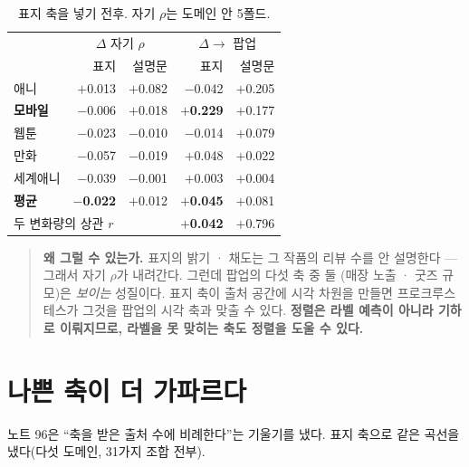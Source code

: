 \documentclass[10pt]{article}
\begin{document}
\begin{table}[t]
\centering\tsize
\caption{표지 축을 넣기 전후. 자기 $\rho$는 도메인 안 5폴드.}
\begin{tabular}{lrrrr}
\toprule
& \multicolumn{2}{c}{$\Delta$ 자기 $\rho$} & \multicolumn{2}{c}{$\Delta \to$ 팝업} \\
& 표지 & 설명문 & 표지 & 설명문 \\
\midrule
애니 & $+$0.013 & $+$0.082 & $-$0.042 & $+$0.205 \\
\textbf{모바일} & $-$0.006 & $+$0.018 & \textbf{$+$0.229} & $+$0.177 \\
웹툰 & $-$0.023 & $-$0.010 & $-$0.014 & $+$0.079 \\
만화 & $-$0.057 & $-$0.019 & $+$0.048 & $+$0.022 \\
세계애니 & $-$0.039 & $-$0.001 & $+$0.003 & $+$0.004 \\
\midrule
\textbf{평균} & \textbf{$-$0.022} & $+$0.012 & \textbf{$+$0.045} & $+$0.081 \\
\midrule
\multicolumn{3}{l}{두 변화량의 상관 $r$} & \textbf{$+$0.042} & $+$0.796 \\
\bottomrule
\end{tabular}
\end{table}


\begin{quote}\fontsize{9.5}{11.5}\selectfont
\textbf{왜 그럴 수 있는가.} 표지의 밝기 · 채도는 그 작품의 리뷰 수를 안
설명한다 --- 그래서 자기 $\rho$가 내려간다. 그런데 팝업의 다섯 축 중 둘
(매장 노출 · 굿즈 규모)은 \emph{보이는} 성질이다. 표지 축이 출처 공간에
시각 차원을 만들면 프로크루스테스가 그것을 팝업의 시각 축과 맞출 수 있다.
\textbf{정렬은 라벨 예측이 아니라 기하로 이뤄지므로, 라벨을 못 맞히는 축도
정렬을 도울 수 있다.}
\end{quote}

\section{나쁜 축이 더 가파르다}

노트 96은 ``축을 받은 출처 수에 비례한다''는 기울기를 냈다. 표지 축으로 같은
곡선을 냈다(다섯 도메인, 31가지 조합 전부).
\end{document}
